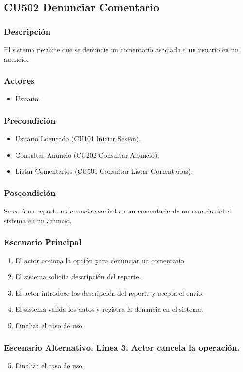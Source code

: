\subsection{CU502 Denunciar Comentario}
\subsubsection{Descripci\'{o}n}
El sistema permite que se denuncie un comentario asociado a un usuario en un anuncio.
\subsubsection{Actores}
\begin{itemize}
\item Usuario.
\end{itemize}
\subsubsection{Precondici\'{o}n}
\begin{itemize}
\item Usuario Logueado (CU101 Iniciar Sesi\'{o}n).
\item Consultar Anuncio (CU202 Consultar Anuncio).
\item Listar Comentarios (CU501 Consultar Listar Comentarios).
\end{itemize}
\subsubsection{Poscondici\'{o}n}
Se cre\'{o} un reporte o denuncia asociado a un comentario de un usuario del el sistema en un anuncio.
\subsubsection{Escenario Principal}
\begin{enumerate}
\item El actor acciona la opci\'{o}n para denunciar un comentario.
\item El sistema solicita descripci\'{o}n del reporte.
\item El actor introduce los descripci\'{o}n del reporte y acepta el env\'{i}o.
\item El sistema valida los datos y registra la denuncia en el sistema.
\item Finaliza el caso de uso.
\end{enumerate}
\subsubsection{Escenario Alternativo. L\'{i}nea 3. Actor cancela la operaci\'{o}n.}
\begin{enumerate}
\setcounter{enumi}{4}
\item Finaliza el caso de uso.
\end{enumerate}
